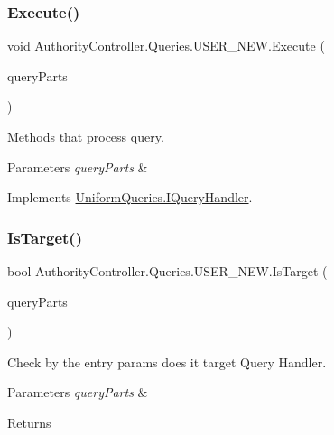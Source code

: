 \subsubsection{\texorpdfstring{Execute()}{Execute()}}
{\footnotesize\ttfamily void Authority\+Controller.\+Queries.\+U\+S\+E\+R\+\_\+\+N\+E\+W.\+Execute (\begin{DoxyParamCaption}\item[{\mbox{\hyperlink{struct_uniform_queries_1_1_query_part}{Query\+Part}} \mbox{[}$\,$\mbox{]}}]{query\+Parts }\end{DoxyParamCaption})}



Methods that process query. 


\begin{DoxyParams}{Parameters}
{\em query\+Parts} & \\
\hline
\end{DoxyParams}


Implements \mbox{\hyperlink{interface_uniform_queries_1_1_i_query_handler_a66d15db03bdd5b0caf6eef96f9b803c0}{Uniform\+Queries.\+I\+Query\+Handler}}.

\mbox{\label{class_authority_controller_1_1_queries_1_1_u_s_e_r___n_e_w_a6e26596b5a5ecc3d07591766b5d325ec}} 
\subsubsection{\texorpdfstring{Is\+Target()}{IsTarget()}}
{\footnotesize\ttfamily bool Authority\+Controller.\+Queries.\+U\+S\+E\+R\+\_\+\+N\+E\+W.\+Is\+Target (\begin{DoxyParamCaption}\item[{\mbox{\hyperlink{struct_uniform_queries_1_1_query_part}{Query\+Part}} \mbox{[}$\,$\mbox{]}}]{query\+Parts }\end{DoxyParamCaption})}



Check by the entry params does it target Query Handler. 


\begin{DoxyParams}{Parameters}
{\em query\+Parts} & \\
\hline
\end{DoxyParams}
\begin{DoxyReturn}{Returns}

\end{DoxyReturn}



